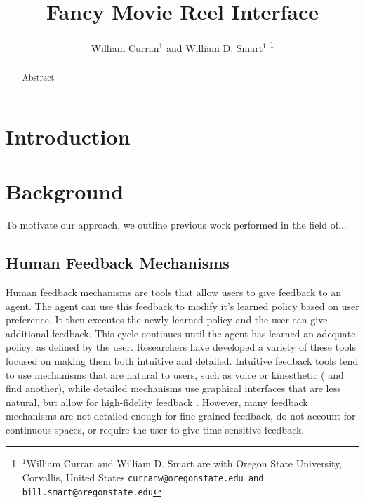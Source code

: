 \documentclass[letterpaper, 10 pt, conference]{ieeeconf}
\begin{document}
\title{\LARGE \bf Fancy Movie Reel Interface}

\author{William Curran$^{1}$ and William D. Smart$^{1}$%
\thanks{$^{1}$William Curran and William D. Smart are with Oregon State University, Corvallis, United States
        {\tt\small curranw@oregonstate.edu and bill.smart@oregonstate.edu}}%
}
 
\maketitle
\thispagestyle{empty}
\pagestyle{empty}
\begin{abstract}
Abstract

\end{abstract}
\section{Introduction}


\section{Background}
To motivate our approach, we outline previous work performed in the field of...


\subsection{Human Feedback Mechanisms}
Human feedback mechanisms are tools that allow users to give feedback to an agent. The agent can use this feedback to modify it's learned policy based on user preference. It then executes the newly learned policy and the user can give additional feedback. This cycle continues until the agent has learned an adequate policy, as defined by the user. Researchers have developed a variety of these tools focused on making them both intuitive and detailed. Intuitive feedback tools tend to use mechanisms that are natural to users, such as voice \cite{cakmak12hri} or kinesthetic (\cite{cakmak12hri} and find another), while detailed mechanisms use graphical interfaces that are less natural, but allow for high-fidelity feedback \cite{Thomaz:2006:RLH:1597538.1597696,Harutyunyan:2015:SMH:2772879.2773501}. However, many feedback mechanisms are not detailed enough for fine-grained feedback, do not account for continuous spaces, or require the user to give time-sensitive feedback.
\end{document}

